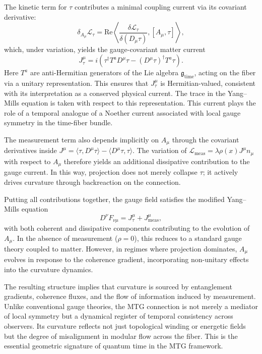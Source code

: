 \documentclass[11pt]{article}
\begin{document}
The kinetic term for \( \tau \) contributes a minimal coupling current via its covariant derivative:
\begin{equation}
\delta_{A_\mu} \mathcal{L}_\tau = \mathrm{Re} \left\langle \frac{\delta \mathcal{L}_\tau}{\delta (D_\mu \tau)}, [A_\mu, \tau] \right\rangle,
\end{equation}
which, under variation, yields the gauge-covariant matter current
\begin{equation}
J^{\mu}_{\tau} = i \left( \tau^\dagger T^a D^\mu \tau - (D^\mu \tau)^\dagger T^a \tau \right).
\end{equation}
Here \( T^a \) are anti-Hermitian generators of the Lie algebra \( \mathfrak{g}_{\mathrm{time}} \), acting on the fiber via a unitary representation. This ensures that \( J^\mu_\tau \) is Hermitian-valued, consistent with its interpretation as a conserved physical current. The trace in the Yang--Mills equation is taken with respect to this representation. This current plays the role of a temporal analogue of a Noether current associated with local gauge symmetry in the time-fiber bundle.

The measurement term also depends implicitly on \( A_\mu \) through the covariant derivatives inside \( J^\mu = \langle \tau, D^\mu \tau \rangle - \langle D^\mu \tau, \tau \rangle \). The variation of \( \mathcal{L}_{\mathrm{meas}} = \lambda \rho(x) J^\mu n_\mu \) with respect to \( A_\mu \) therefore yields an additional dissipative contribution to the gauge current. In this way, projection does not merely collapse \( \tau \); it actively drives curvature through backreaction on the connection.

Putting all contributions together, the gauge field satisfies the modified Yang--Mills equation
\begin{equation}
D^\nu F_{\nu\mu} = J^{\mu}_{\tau} + J^{\mu}_{\mathrm{meas}},
\end{equation}
with both coherent and dissipative components contributing to the evolution of \( A_\mu \). In the absence of measurement (\( \rho = 0 \)), this reduces to a standard gauge theory coupled to matter. However, in regimes where projection dominates, \( A_\mu \) evolves in response to the coherence gradient, incorporating non-unitary effects into the curvature dynamics.

The resulting structure implies that curvature is sourced by entanglement gradients, coherence fluxes, and the flow of information induced by measurement. Unlike conventional gauge theories, the MTG connection is not merely a mediator of local symmetry but a dynamical register of temporal consistency across observers. Its curvature reflects not just topological winding or energetic fields but the degree of misalignment in modular flow across the fiber. This is the essential geometric signature of quantum time in the MTG framework.
\end{document}
